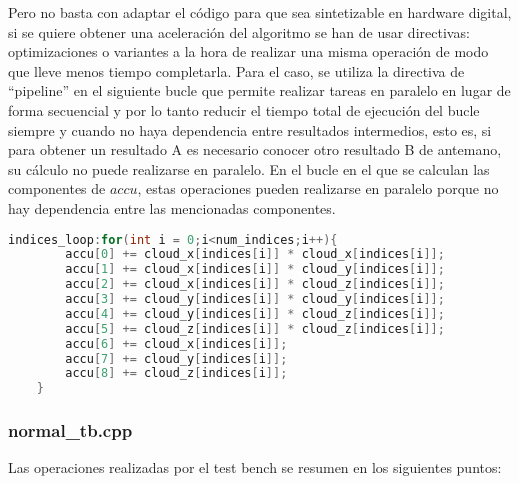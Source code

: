 Pero no basta con adaptar el código para que sea sintetizable en hardware digital, si se quiere obtener una aceleración del algoritmo se han de usar directivas: optimizaciones o variantes a la hora de realizar una misma operación de modo que lleve menos tiempo completarla. Para el caso, se utiliza la directiva de ``pipeline'' en el siguiente bucle que permite realizar tareas en paralelo en lugar de forma secuencial y por lo tanto reducir el tiempo total de ejecución del bucle siempre y cuando no haya dependencia entre resultados intermedios, esto es, si para obtener un resultado A es necesario conocer otro resultado B de antemano, su cálculo no puede realizarse en paralelo. En el bucle en el que se calculan las componentes de $accu$, estas operaciones pueden realizarse en paralelo porque no hay dependencia entre las mencionadas componentes.

 \begin{lstlisting}[language=C++,breaklines]
indices_loop:for(int i = 0;i<num_indices;i++){
		accu[0] += cloud_x[indices[i]] * cloud_x[indices[i]];
		accu[1] += cloud_x[indices[i]] * cloud_y[indices[i]];
		accu[2] += cloud_x[indices[i]] * cloud_z[indices[i]];
		accu[3] += cloud_y[indices[i]] * cloud_y[indices[i]];
		accu[4] += cloud_y[indices[i]] * cloud_z[indices[i]];
		accu[5] += cloud_z[indices[i]] * cloud_z[indices[i]];
		accu[6] += cloud_x[indices[i]];
		accu[7] += cloud_y[indices[i]];
		accu[8] += cloud_z[indices[i]];
	}
\end{lstlisting}

\subsubsection{normal\_tb.cpp}
Las operaciones realizadas por el test bench se resumen en los siguientes puntos:

